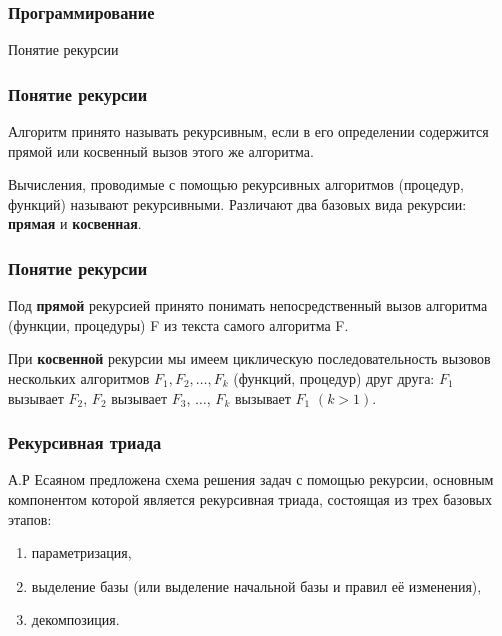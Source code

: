 \subtitle{Лекция 11 --- Программирование: Рекурсия}

\frame[plain]
{\titlepage}	%


\begin{frame}
\frametitle{Программирование}

\begin{center}

\Huge
Понятие рекурсии
\end{center}
\end{frame}

	\begin{frame}
\frametitle{Понятие рекурсии}
Алгоритм принято называть рекурсивным, если в его определении содержится прямой или косвенный вызов этого же алгоритма. 

Вычисления, проводимые с помощью рекурсивных алгоритмов (процедур, функций) называют рекурсивными. 
Различают два базовых вида рекурсии: \textbf{прямая} и \textbf{косвенная}. 

\end{frame}

		\begin{frame}
\frametitle{Понятие рекурсии}


Под \textbf{прямой} рекурсией принято понимать непосредственный вызов алгоритма (функции, процедуры) F из текста самого алгоритма F. 

При \textbf{косвенной} рекурсии мы имеем циклическую последовательность вызовов нескольких алгоритмов $F_1, F_2, …, F_k$ (функций, процедур) друг друга: $F_1$ вызывает $F_2$, $F_2$ вызывает $F_3$, $\ldots$, $F_k$ вызывает $F_1$ $(k>1)$.


\end{frame}

		\begin{frame}
\frametitle{Рекурсивная триада}

А.Р Есаяном предложена схема решения задач с помощью рекурсии, основным компонентом которой является рекурсивная триада, состоящая из трех базовых этапов: 
\begin{enumerate}
	\item параметризация, 
	\item выделение базы (или выделение начальной базы и правил её изменения), 
	\item декомпозиция.
\end{enumerate}

\end{frame}

